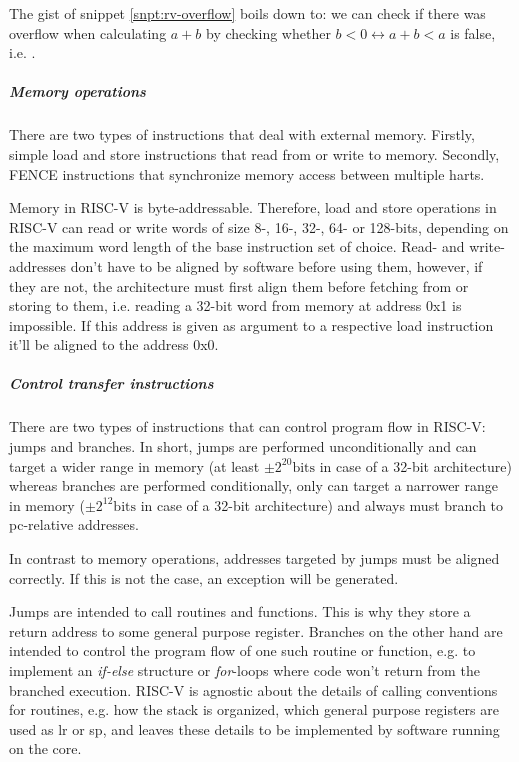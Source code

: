 The gist of snippet \ref{snpt:rv-overflow} boils down to: we can check if there was overflow when calculating $ a + b $ by checking whether $ b < 0 \leftrightarrow a + b < a $ is false, i.e. .

\subparagraph{Memory operations}
There are two types of instructions that deal with external memory.
Firstly, simple load and store instructions that read from or write to memory.
Secondly, FENCE instructions that synchronize memory access between multiple \glspl{hart}.

Memory in RISC-V is byte-addressable.
Therefore, load and store operations in RISC-V can read or write words of size 8-, 16-, 32-, 64- or 128-bits, depending on the maximum word length of the base instruction set of choice.
Read- and write-addresses don't have to be aligned by software before using them, however, if they are not, the architecture must first align them before fetching from or storing to them, i.e. reading a 32-bit word from memory at address 0x1 is impossible.
If this address is given as argument to a respective load instruction it'll be aligned to the address 0x0.

\subparagraph{Control transfer instructions}
There are two types of instructions that can control program flow in RISC-V: jumps and branches.
In short, jumps are performed unconditionally and can target a wider range in memory (at least $ \pm 2^{20}\text{bits} $ in case of a 32-bit architecture) whereas branches are performed conditionally, only can target a narrower range in memory ($ \pm 2^{12}\text{bits} $ in case of a 32-bit architecture) and always must branch to \gls{pc}-relative addresses.

In contrast to memory operations, addresses targeted by jumps must be aligned correctly.
If this is not the case, an exception will be generated.

Jumps are intended to call routines and functions.
This is why they store a return address to some general purpose register.
Branches on the other hand are intended to control the program flow of one such routine or function, e.g. to implement an \textit{if-else} structure or \textit{for}-loops where code won't return from the branched execution.
RISC-V is agnostic about the details of calling conventions for routines, e.g. how the stack is organized, which general purpose registers are used as \gls{lr} or \gls{sp}, and leaves these details to be implemented by software running on the core.

